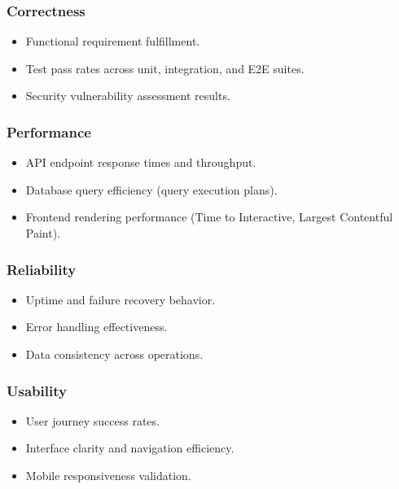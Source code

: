 \documentclass[11pt,a4paper]{article}
\begin{document}
\subsubsection{Correctness}

\begin{itemize}
    \item Functional requirement fulfillment.
    \item Test pass rates across unit, integration, and E2E suites.
    \item Security vulnerability assessment results.
\end{itemize}

\subsubsection{Performance}

\begin{itemize}
    \item API endpoint response times and throughput.
    \item Database query efficiency (query execution plans).
    \item Frontend rendering performance (Time to Interactive, Largest Contentful Paint).
\end{itemize}

\subsubsection{Reliability}

\begin{itemize}
    \item Uptime and failure recovery behavior.
    \item Error handling effectiveness.
    \item Data consistency across operations.
\end{itemize}

\subsubsection{Usability}

\begin{itemize}
    \item User journey success rates.
    \item Interface clarity and navigation efficiency.
    \item Mobile responsiveness validation.
\end{itemize}
\end{document}
